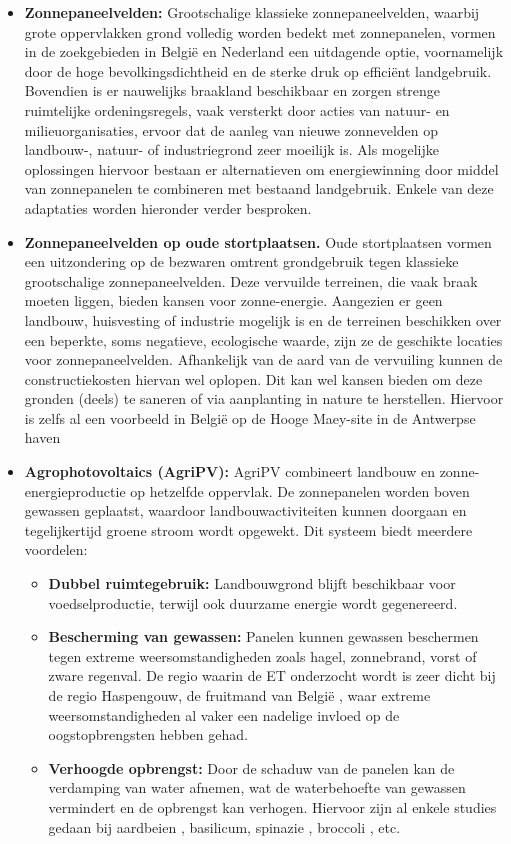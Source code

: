 \begin{itemize}
    \item \textbf{Zonnepaneelvelden:} Grootschalige klassieke zonnepaneelvelden, waarbij grote oppervlakken grond volledig worden bedekt met zonnepanelen, vormen in de zoekgebieden in België en Nederland een uitdagende optie, voornamelijk door de hoge bevolkingsdichtheid en de sterke druk op efficiënt landgebruik. Bovendien is er nauwelijks braakland beschikbaar en zorgen strenge ruimtelijke ordeningsregels, vaak versterkt door acties van natuur- en milieuorganisaties, ervoor dat de aanleg van nieuwe zonnevelden op landbouw-, natuur- of industriegrond zeer moeilijk is. Als mogelijke oplossingen hiervoor bestaan er alternatieven om energiewinning door middel van zonnepanelen te combineren met bestaand landgebruik. Enkele van deze adaptaties worden hieronder verder besproken.
    \item \textbf{Zonnepaneelvelden op oude stortplaatsen.} Oude stortplaatsen vormen een uitzondering op de bezwaren omtrent grondgebruik tegen klassieke grootschalige zonnepaneelvelden. Deze vervuilde terreinen, die vaak braak moeten liggen, bieden kansen voor zonne-energie. Aangezien er geen landbouw, huisvesting of industrie mogelijk is en de terreinen beschikken over een beperkte, soms negatieve, ecologische waarde, zijn ze de geschikte locaties voor zonnepaneelvelden. Afhankelijk van de aard van de vervuiling kunnen de constructiekosten hiervan wel oplopen. Dit kan wel kansen bieden om deze gronden (deels) te saneren of via aanplanting in nature te herstellen. Hiervoor is zelfs al een voorbeeld in België op de Hooge Maey-site in de Antwerpse haven \autocite{Indaver2026}
    \item \textbf{Agrophotovoltaics (AgriPV):} AgriPV combineert landbouw en zonne-\-energie\-productie op hetzelfde oppervlak. De zonnepanelen worden boven gewassen geplaatst, waardoor landbouwactiviteiten kunnen doorgaan en tegelijkertijd groene stroom wordt opgewekt. Dit systeem biedt meerdere voordelen:
    
    \begin{itemize}
        \item \textbf{Dubbel ruimtegebruik:} Landbouwgrond blijft beschikbaar voor voedselproductie, terwijl ook duurzame energie wordt gegenereerd.
        \item \textbf{Bescherming van gewassen:} Panelen kunnen gewassen beschermen tegen extreme weersomstandigheden zoals hagel, zonnebrand, vorst of zware regenval. De regio waarin de ET onderzocht wordt is zeer dicht bij de regio Haspengouw, de fruitmand van België \autocite{ALZ2026}, waar extreme weersomstandigheden al vaker een nadelige invloed op de oogstopbrengsten hebben gehad.
        \item \textbf{Verhoogde opbrengst:} Door de schaduw van de panelen kan de verdamping van water afnemen, wat de waterbehoefte van gewassen vermindert en de opbrengst kan verhogen. Hiervoor zijn al enkele studies gedaan bij aardbeien \autocite{Jamil2025}, basilicum, spinazie \autocite{Thompson2020}, broccoli \autocite{Hudelson2021}, etc.
    \end{itemize}


\end{itemize}
